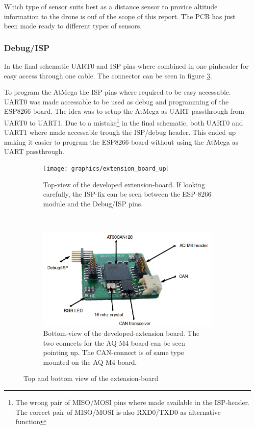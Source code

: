 Which type of sensor suits best as a distance sensor to provice altitude information to the drone is ouf of the scope of this report. The PCB has just been made ready to different types of sensors.

\subsubsection*{Debug/ISP}
In the final schematic UART0 and ISP pins where combined in one pinheader for easy access through one cable.
The connector can be seen in figure \ref{fig:extension_board}.

To program the AtMega the ISP pins where required to be easy accessable. 
UART0 was made accessable to be used as debug and programming of the ESP8266 board.
The idea was to setup the AtMega as UART passthrough from UART0 to UART1.
Due to a mistake\footnote{The wrong pair of MISO/MOSI pins where made available in the ISP-header. The correct pair of MISO/MOSI is also RXD0/TXD0 as alternative function} in the final schematic, both UART0 and UART1 where made accessable trough the ISP/debug header. 
This ended up making it easier to program the ESP8266-board without using the AtMega as UART passthrough.

\begin{figure}[H]
    \centering
    \begin{subfigure}[b]{0.45\textwidth}
        \texttt{[image: graphics/extension\_board\_up]}
        \caption{Top-view of the developed extension-board. If looking carefully, the ISP-fix can be seen between the ESP-8266 module and the Debug/ISP pins.}
        \label{fig:extension_board_up}
    \end{subfigure}
    ~ 
    \begin{subfigure}[b]{0.51\textwidth}
        \includegraphics[width=\textwidth]{graphics/extension_board_down}
        \caption{Bottom-view of the developed-extension board. The two connects for the AQ M4 board can be seen pointing up. The CAN-connect is of same type mounted on the AQ M4 board.}
        \label{fig:extension_board_down}
    \end{subfigure}
    \caption{Top and bottom view of the extension-board}\label{fig:extension_board}
\end{figure}


